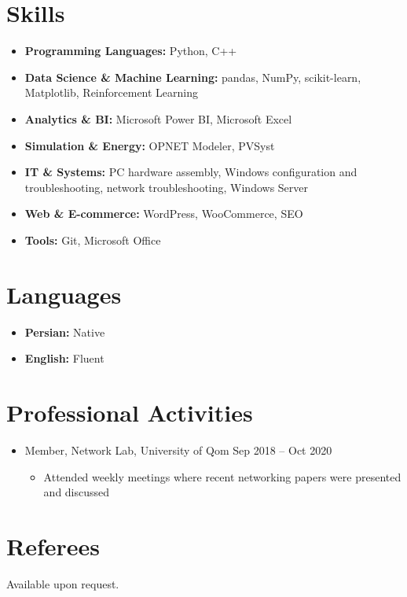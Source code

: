 \documentclass[10pt]{article}
\newenvironment{dashes}{\begin{itemize}[label=--,leftmargin=2.2em,topsep=1pt,itemsep=0pt,parsep=0pt]}{\end{itemize}}
\newenvironment{bullets}{\begin{itemize}[leftmargin=1.2em,topsep=1pt,itemsep=1pt,parsep=0pt]}{\end{itemize}}
\begin{document}
\section{Skills}
\begin{bullets}
\item \textbf{Programming Languages:} Python, C++
\item \textbf{Data Science \& Machine Learning:} pandas, NumPy, scikit-learn, Matplotlib, Reinforcement Learning
\item \textbf{Analytics \& BI:} Microsoft Power BI, Microsoft Excel
\item \textbf{Simulation \& Energy:} OPNET Modeler, PVSyst
\item \textbf{IT \& Systems:} PC hardware assembly, Windows configuration and troubleshooting, network troubleshooting, Windows Server
\item \textbf{Web \& E-commerce:} WordPress, WooCommerce, SEO
\item \textbf{Tools:} Git, Microsoft Office
\end{bullets}

\section{Languages}
\begin{bullets}
\item \textbf{Persian:} Native
\item \textbf{English:} Fluent
\end{bullets}

\section{Professional Activities}
\begin{bullets}
\item Member, Network Lab, University of Qom \hfill Sep 2018 -- Oct 2020
\begin{dashes}\item Attended weekly meetings where recent networking papers were presented and discussed\end{dashes}
\end{bullets}

\section{Referees}
Available upon request.
\end{document}
